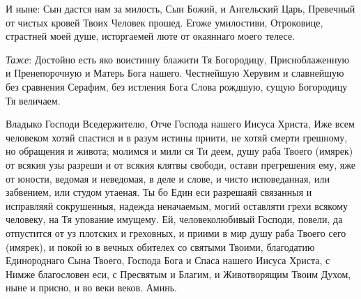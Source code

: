 \begin{mymulticols}
И ныне: Сын дастся нам за милость, Сын Божий, и Ангельский Царь, Превечный от чистых кровей Твоих Человек прошед. Егоже умилостиви, Отроковице, страстней моей душе, исторгаемей люте от окаяннаго моего телесе. 

{\itshape Таже}: Достойно есть яко воистинну блажити Тя Богородицу, Присноблаженную и Пренепорочную и Матерь Бога нашего. Честнейшую Херувим и славнейшую без сравнения Серафим, без истления Бога Слова рождшую, сущую Богородицу Тя величаем.




Владыко Господи Вседержителю, Отче Господа нашего Иисуса Христа, Иже всем человеком хотяй спастися и в разум истины приити, не хотяй смерти грешному, но обращения и живота; молимся и мили ся Ти деем, душу раба Твоего (имярек) от всякия узы разреши и от всякия клятвы свободи, остави прегрешения ему, яже от юности, ведомая и неведомая, в деле и слове, и чисто исповеданная, или забвением, или студом утаеная. Ты бо Един еси разрешаяй связанныя и исправляяй сокрушенныя, надежда неначаемым, могий оставляти грехи всякому человеку, на Тя упование имущему. Ей, человеколюбивый Господи, повели, да отпустится от уз плотских и греховных, и приими в мир душу раба Твоего сего (имярек), и покой ю в вечных обителех со святыми Твоими, благодатию Единороднаго Сына Твоего, Господа Бога и Спаса нашего Иисуса Христа, с Нимже благословен еси, с Пресвятым и Благим, и Животворящим Твоим Духом, ныне и присно, и во веки веков. Аминь.

\end{mymulticols}

\mychapterending


